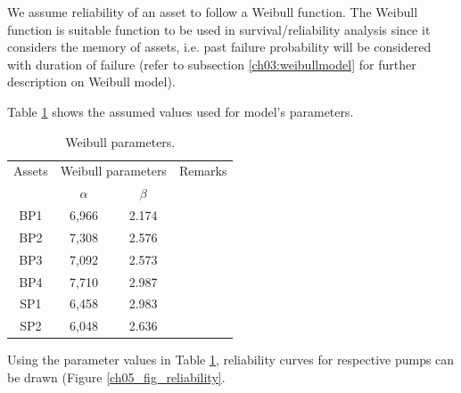 

We assume reliability of an asset to follow a Weibull function. The Weibull function is suitable function to be used in survival/reliability analysis since it considers the memory of assets, i.e. past failure probability will be considered with duration of failure (refer to subsection \ref{ch03:weibullmodel} for further description on Weibull model).

Table \ref{ch05_tbl_weibullpara} shows the assumed values used for model's parameters.

\begin{table}[h]
	\caption{Weibull parameters.}
	\label{ch05_tbl_weibullpara}
	{\footnotesize
\begin{tabular}{c|c|c|l}
	\hline
	Assets & \multicolumn{2}{c|}{Weibull parameters} & Remarks \\ 
	\cline{2-3}
	& $\alpha$ & $\beta$ &  \\ 
	\hline
	BP1 & 6,966 & 2.174 &  \\ 
	BP2 & 7,308 & 2.576 &  \\ 
	BP3 & 7,092 & 2.573 &  \\ 
	BP4 & 7,710 & 2.987 &  \\ 
	SP1 & 6,458 & 2.983 &  \\ 
	SP2 & 6,048 & 2.636 &  \\ 
	\hline
\end{tabular}
	}
\end{table}

Using the parameter values in Table \ref{ch05_tbl_weibullpara}, reliability curves for respective pumps can be drawn (Figure \ref{ch05_fig_reliability}. %

